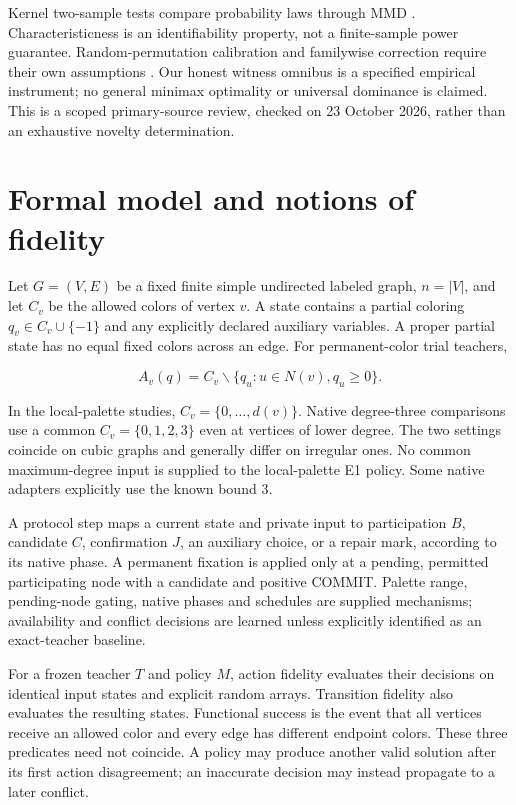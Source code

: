 \documentclass[
  11pt,
]{article}
\begin{document}
Kernel two-sample tests compare probability laws through MMD
\citep{gretton2012kernel}. Characteristicness is an identifiability
property, not a finite-sample power guarantee. Random-permutation
calibration and familywise correction require their own assumptions
\citep{hemerik2018exact, holm1979simple}. Our honest witness omnibus is
a specified empirical instrument; no general minimax optimality or
universal dominance is claimed. This is a scoped primary-source review,
checked on 23 October 2026, rather than an exhaustive novelty
determination.

\section{Formal model and notions of
fidelity}\label{formal-model-and-notions-of-fidelity}

Let \(G=(V,E)\) be a fixed finite simple undirected labeled graph,
\(n=|V|\), and let \(C_v\) be the allowed colors of vertex \(v\). A
state contains a partial coloring \(q_v\in C_v\cup\{-1\}\) and any
explicitly declared auxiliary variables. A proper partial state has no
equal fixed colors across an edge. For permanent-color trial teachers,

\[ A_v(q)=C_v\smallsetminus\{q_u:u\in N(v),q_u\ge0\}. \]

In the local-palette studies, \(C_v=\{0,\ldots,d(v)\}\). Native
degree-three comparisons use a common \(C_v=\{0,1,2,3\}\) even at
vertices of lower degree. The two settings coincide on cubic graphs and
generally differ on irregular ones. No common maximum-degree input is
supplied to the local-palette E1 policy. Some native adapters explicitly
use the known bound 3.

A protocol step maps a current state and private input to participation
\(B\), candidate \(C\), confirmation \(J\), an auxiliary choice, or a
repair mark, according to its native phase. A permanent fixation is
applied only at a pending, permitted participating node with a candidate
and positive COMMIT. Palette range, pending-node gating, native phases
and schedules are supplied mechanisms; availability and conflict
decisions are learned unless explicitly identified as an exact-teacher
baseline.

For a frozen teacher \(T\) and policy \(M\), action fidelity evaluates
their decisions on identical input states and explicit random arrays.
Transition fidelity also evaluates the resulting states. Functional
success is the event that all vertices receive an allowed color and
every edge has different endpoint colors. These three predicates need
not coincide. A policy may produce another valid solution after its
first action disagreement; an inaccurate decision may instead propagate
to a later conflict.
\end{document}
